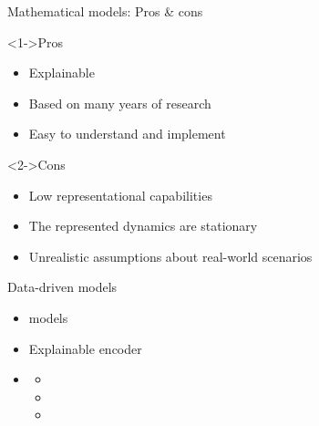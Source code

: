 
\begin{frame}{Mathematical models: Pros \& cons}
    \begin{exampleblock}<1->{Pros}
    \begin{itemize}
        \item Explainable
        \item Based on many years of research
        \item Easy to understand and implement
    \end{itemize}
    \end{exampleblock}

    \begin{alertblock}<2->{Cons}
    \begin{itemize}
        \item Low representational capabilities
        \item The represented dynamics are stationary
        \item Unrealistic assumptions about real-world scenarios
    \end{itemize}
    \end{alertblock}
\end{frame}

\begin{frame}{Data-driven models}
    \begin{itemize}
        \item<1->  models \cite{ceylanEstimationCOVID19Prevalence2020,singhPredictionCOVID19Pandemic2020,ribeiroShorttermForecastingCOVID192020}
        \item<2-> Explainable  encoder \cite{ramchandaniDeepCOVIDNetInterpretableDeep2020}
        \item<3->  \cite{chimmulaTimeSeriesForecasting2020,shahidPredictionsCOVID19Deep2020}
        \begin{itemize}
            \item {}
            \item {}
            \item {}
        \end{itemize}
    \end{itemize}
\end{frame}

